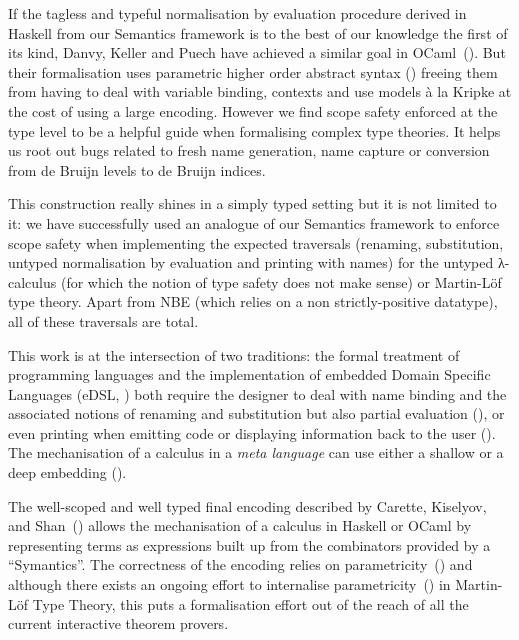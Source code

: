If the tagless and typeful normalisation by evaluation procedure derived in Haskell
from our Semantics framework is to the best of our knowledge the first of its kind,
Danvy, Keller and Puech have achieved a similar goal in OCaml~(\citeyear{danvytagless}).
But their formalisation uses parametric higher order abstract syntax
(\cite{chlipala2008parametric})
freeing them from having to deal with variable binding, contexts and use models à
la Kripke at the cost of using a large encoding. However we find scope safety
enforced at the type level to be a helpful guide when formalising complex
type theories. It helps us root out bugs related to fresh name generation,
name capture or conversion from de Bruijn levels to de Bruijn indices.

This construction really shines in a simply typed setting but it is not
limited to it: we have successfully used an analogue of our Semantics
framework to enforce scope safety when implementing the expected traversals
(renaming, substitution, untyped normalisation by evaluation and printing
with names) for the untyped λ-calculus (for which the notion of type safety
does not make sense) or Martin-Löf type theory. Apart from NBE (which relies
on a non strictly-positive datatype), all of these traversals are total.

This work is at the intersection of two traditions: the formal treatment
of programming languages and the implementation of embedded Domain Specific
Languages (eDSL, \cite{hudak1996building}) both require the designer to
deal with name binding and the associated notions of renaming and substitution
but also partial evaluation (\cite{danvy1999type}), or even printing when
emitting code or displaying information back to the user (\cite{wiedijk2012pollack}).
The mechanisation of a calculus in a \emph{meta language} can use either
a shallow or a deep embedding (\cite{svenningsson2013combining,gill2014domain}).


The well-scoped and well typed final encoding described by Carette, Kiselyov,
and Shan~(\citeyear{carette2009finally}) allows the mechanisation of a calculus in
Haskell or OCaml by representing terms as expressions built up from the
combinators provided by a ``Symantics''. The correctness of the encoding
relies on parametricity~(\cite{reynolds1983types}) and although there exists
an ongoing effort to internalise parametricity~(\cite{bernardy2013type}) in
Martin-Löf Type Theory, this puts a formalisation effort out of the reach of all the
current interactive theorem provers.

